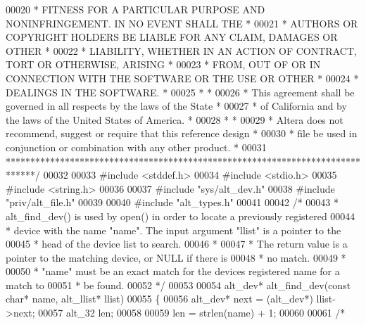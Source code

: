 \begin{DoxyCode}
00020 \textcolor{comment}{* FITNESS FOR A PARTICULAR PURPOSE AND NONINFRINGEMENT. IN NO EVENT SHALL THE *}
00021 \textcolor{comment}{* AUTHORS OR COPYRIGHT HOLDERS BE LIABLE FOR ANY CLAIM, DAMAGES OR OTHER      *}
00022 \textcolor{comment}{* LIABILITY, WHETHER IN AN ACTION OF CONTRACT, TORT OR OTHERWISE, ARISING     *}
00023 \textcolor{comment}{* FROM, OUT OF OR IN CONNECTION WITH THE SOFTWARE OR THE USE OR OTHER         *}
00024 \textcolor{comment}{* DEALINGS IN THE SOFTWARE.                                                   *}
00025 \textcolor{comment}{*                                                                             *}
00026 \textcolor{comment}{* This agreement shall be governed in all respects by the laws of the State   *}
00027 \textcolor{comment}{* of California and by the laws of the United States of America.              *}
00028 \textcolor{comment}{*                                                                             *}
00029 \textcolor{comment}{* Altera does not recommend, suggest or require that this reference design    *}
00030 \textcolor{comment}{* file be used in conjunction or combination with any other product.          *}
00031 \textcolor{comment}{******************************************************************************/}
00032 
00033 \textcolor{preprocessor}{#include <stddef.h>}
00034 \textcolor{preprocessor}{#include <stdio.h>}
00035 \textcolor{preprocessor}{#include <string.h>}
00036 
00037 \textcolor{preprocessor}{#include "sys/alt_dev.h"}
00038 \textcolor{preprocessor}{#include "priv/alt_file.h"}
00039 
00040 \textcolor{preprocessor}{#include "alt_types.h"}
00041 
00042 \textcolor{comment}{/* }
00043 \textcolor{comment}{ * alt\_find\_dev() is used by open() in order to locate a previously registered }
00044 \textcolor{comment}{ * device with the name "name". The input argument "llist" is a pointer to the}
00045 \textcolor{comment}{ * head of the device list to search.}
00046 \textcolor{comment}{ *}
00047 \textcolor{comment}{ * The return value is a pointer to the matching device, or NULL if there is}
00048 \textcolor{comment}{ * no match. }
00049 \textcolor{comment}{ *}
00050 \textcolor{comment}{ * "name" must be an exact match for the devices registered name for a match to}
00051 \textcolor{comment}{ * be found.}
00052 \textcolor{comment}{ */}
00053  
00054 alt_dev* alt_find_dev(\textcolor{keyword}{const} \textcolor{keywordtype}{char}* name, alt_llist* llist)
00055 \{
00056   alt_dev* next = (alt_dev*) llist->next;
00057   alt_32 len;
00058 
00059   len  = strlen(name) + 1;
00060 
00061   \textcolor{comment}{/*}

\end{DoxyCode}

